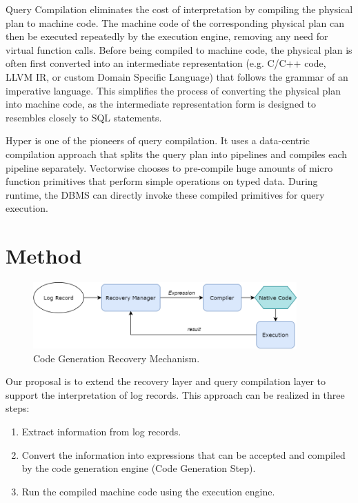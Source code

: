 \documentclass[12pt]{cmuthesis}
\begin{document}
Query Compilation eliminates the cost of interpretation by compiling the physical plan to machine code. The machine code of the corresponding physical plan can then be executed repeatedly by the execution engine, removing any need for virtual function calls. Before being compiled to machine code, the physical plan is often first converted into an intermediate representation (e.g. C/C++ code, LLVM IR, or custom Domain Specific Language) that follows the grammar of an imperative language. This simplifies the process of converting the physical plan into machine code, as the intermediate representation form is designed to resembles closely to SQL statements. 

Hyper\cite{neumann11} is one of the pioneers of query compilation. It uses a data-centric compilation approach that splits the query plan into pipelines and compiles each pipeline separately. Vectorwise\cite{raducanu13} chooses to pre-compile huge amounts of micro function primitives that perform simple operations on typed data. During runtime, the DBMS can directly invoke these compiled primitives for query execution.

\chapter{Method}
\begin{figure}[H]
\centering
\includegraphics[width=0.9\textwidth]{images/Proposal.png}
\caption{Code Generation Recovery Mechanism.}
\label{fig:codegen_recovery}
\end{figure}

Our proposal is to extend the recovery layer and query compilation layer to support the interpretation of log records. This approach can be realized in three steps:

\begin{enumerate}
\item Extract information from log records.
\item Convert the information into expressions that can be accepted and compiled by the code generation engine (Code Generation Step).
\item Run the compiled machine code using the execution engine.
\end{enumerate}
\end{document}
